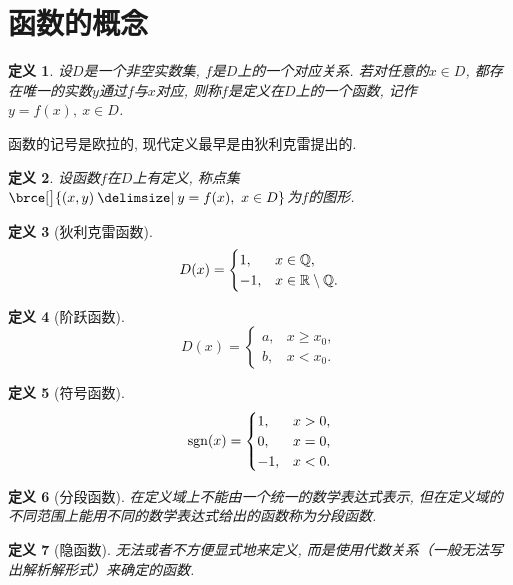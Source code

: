 \documentclass[a4paper,punct=CCT]{ctexbook}
\theoremstyle{break}
\newtheorem*{definition*}{定义}
\let\geq\geqslant
\let\ge\geq}
\begin{document}
\section{函数的概念}

\begin{definition*}
  设\(D\)是一个非空实数集, \(f\)是\(D\)上的一个对应关系.  若对任意的\(x \in D\), 都存在唯一的实数\(y\)通过\(f\)与\(x\)对应, 则称\(f\)是定义在\(D\)上的一个函数, 记作\(y = f(x),\ x \in D\).
\end{definition*}

函数的记号是欧拉的, 现代定义最早是由狄利克雷提出的.

\begin{definition*}
  设函数\(f\)在\(D\)上有定义, 称点集\(\brce[\big]{(x,y) \mid y = f(x),\ x \in D}\)为\(f\)的图形.
\end{definition*}

\begin{definition*}[狄利克雷函数]
  \[
    D(x) =
    \begin{cases}
      1, & x \in \mathbb{Q}, \\
      -1, & x \in \mathbb{R} \setminus \mathbb{Q}.
    \end{cases}
  \]
\end{definition*}

\begin{definition*}[阶跃函数]
  \[
    D(x) =
    \begin{cases}
      a, & x \ge x_0, \\
      b, & x < x_0.
    \end{cases}
  \]
\end{definition*}

\begin{definition*}[符号函数]
  \[
    \operatorname{sgn}(x) =
    \begin{cases}
      1, & x > 0, \\
      0, & x = 0, \\
      -1, & x < 0.
    \end{cases}
  \]
\end{definition*}

\begin{definition*}[分段函数]
  在定义域上不能由一个统一的数学表达式表示, 但在定义域的不同范围上能用不同的数学表达式给出的函数称为分段函数.
\end{definition*}

\begin{definition*}[隐函数]
  无法或者不方便显式地来定义, 而是使用代数关系（一般无法写出解析解形式）来确定的函数.
\end{definition*}
\end{document}
